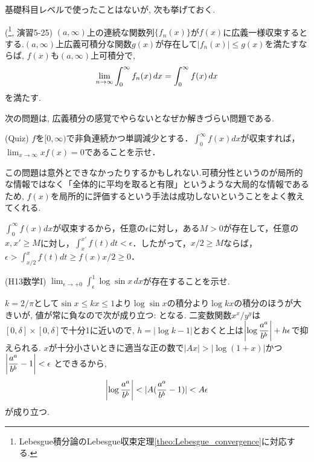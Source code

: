 基礎科目レベルで使ったことはないが, 次も挙げておく.
\besha
\begin{theo} (\footnote{Lebesgue積分論のLebesgue収束定理\ref{theo:Lebesgue_convergence}に対応する.}, \cite{rikou}演習5-25) \label{theo:dom_con_theorem} %
$(a,\infty)$上の連続な関数列$\{ f_n(x)\}$が$f(x)$に広義一様収束するとする.$(a,\infty)$上広義可積分な関数$g(x)$が存在して$|f_n(x)|\leq g(x)$を満たすならば, $f(x)$も$(a,\infty)$上可積分で,
\[\displaystyle\lim_{n\to \infty} \int_{0}^{\infty} f_n(x) \, dx = \int_{0}^{\infty} f(x)\, dx\]
を満たす.
\end{theo}
\ensha



次の問題は, 広義積分の感覚でやらないとなぜか解きづらい問題である.
\begin{egprob} (Quiz)
$f$を$[0,\infty)$で非負連続かつ単調減少とする．$\int_{0}^{\infty}f(x)dx$が収束すれば，$\lim_{x\to\infty}xf(x)=0$であることを示せ．
\end{egprob}
この問題は意外とできなかったりするかもしれない.可積分性というのが局所的な情報ではなく「全体的に平均を取ると有限」というような大局的な情報であるため, $f(x)$を局所的に評価するという手法は成功しないということをよく教えてくれる.
\begin{egans}
$\int_0^{\infty}f(x)dx$が収束するから，任意の$\epsilon$に対し，ある$M>0$が存在して，任意の$x,x'\geq M$に対し，$\int_{x}^{x'}f(t)dt<\epsilon$．したがって，$x/2\geq M$ならば，$\epsilon>\int_{x/2}^{x}f(t)dt\geq f(x)x/2\geq0$．
\end{egans}


\begin{egprob} (H13数学I)
$\lim_{\epsilon \to +0} \int_{\epsilon}^{1} \log{\sin{x}}\, dx$が存在することを示せ.
\end{egprob}
\begin{egans} $k=2/\pi$として$\sin{x} \leq kx \leq 1$より$\log{\sin{x}}$の積分より$\log{kx}$の積分のほうが大きいが, 値が常に負なので次が成り立つ:
となる. 二変数関数$x^x/y^y$は$[0,\delta]\times [0,\delta]$で十分1に近いので, $h=|\log{k} - 1|$とおくと上は$\left| \log{\dfrac{a^a}{b^b}} \right| + h\epsilon$で抑えられる. $x$が十分小さいときに適当な正の数で$|Ax| > |\log{(1+x)}|$かつ$\left| \dfrac{a^a}{b^b} - 1 \right| < \epsilon$ とできるから,
\[\left| \log{\dfrac{a^a}{b^b}} \right| < |A(\dfrac{a^a}{b^b} - 1)| < A\epsilon\]
が成り立つ.
\end{egans}


